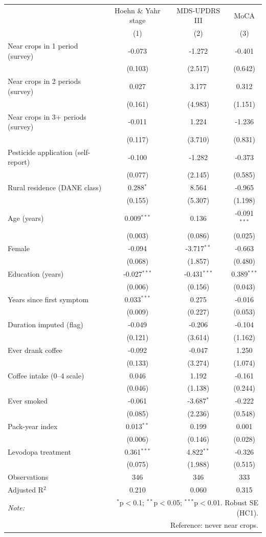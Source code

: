 \begin{tabular}{lccc}
\hline\hline
 & Hoehn \& Yahr stage & MDS-UPDRS III & MoCA \\
 & (1) & (2) & (3) \\
\hline
Near crops in 1 period (survey) & -0.073 & -1.272 & -0.401 \\
 & (0.103) & (2.517) & (0.642) \\
Near crops in 2 periods (survey) & 0.027 & 3.177 & 0.312 \\
 & (0.161) & (4.983) & (1.151) \\
Near crops in 3+ periods (survey) & -0.011 & 1.224 & -1.236 \\
 & (0.117) & (3.710) & (0.831) \\
Pesticide application (self-report) & -0.100 & -1.282 & -0.373 \\
 & (0.077) & (2.145) & (0.585) \\
Rural residence (DANE class) & 0.288$^{*}$ & 8.564 & -0.965 \\
 & (0.155) & (5.307) & (1.198) \\
Age (years) & 0.009$^{***}$ & 0.136 & -0.091$^{***}$ \\
 & (0.003) & (0.086) & (0.025) \\
Female & -0.094 & -3.717$^{**}$ & -0.663 \\
 & (0.068) & (1.857) & (0.480) \\
Education (years) & -0.027$^{***}$ & -0.431$^{***}$ & 0.389$^{***}$ \\
 & (0.006) & (0.156) & (0.043) \\
Years since first symptom & 0.033$^{***}$ & 0.275 & -0.016 \\
 & (0.009) & (0.227) & (0.053) \\
Duration imputed (flag) & -0.049 & -0.206 & -0.104 \\
 & (0.121) & (3.614) & (1.162) \\
Ever drank coffee & -0.092 & -0.047 & 1.250 \\
 & (0.133) & (3.274) & (1.074) \\
Coffee intake (0--4 scale) & 0.046 & 1.192 & -0.161 \\
 & (0.046) & (1.138) & (0.244) \\
Ever smoked & -0.061 & -3.687$^{*}$ & -0.222 \\
 & (0.085) & (2.236) & (0.548) \\
Pack-year index & 0.013$^{**}$ & 0.199 & 0.001 \\
 & (0.006) & (0.146) & (0.028) \\
Levodopa treatment & 0.361$^{***}$ & 4.822$^{**}$ & -0.326 \\
 & (0.075) & (1.988) & (0.515) \\
\hline
Observations & 346 & 346 & 333 \\
Adjusted R$^2$ & 0.210 & 0.060 & 0.315 \\
\hline\hline
\textit{Note:} & \multicolumn{3}{r}{$^{*}$p$<$0.1; $^{**}$p$<$0.05; $^{***}$p$<$0.01. Robust SE (HC1).} \\
 & \multicolumn{3}{r}{Reference: never near crops.} \\
\end{tabular}
